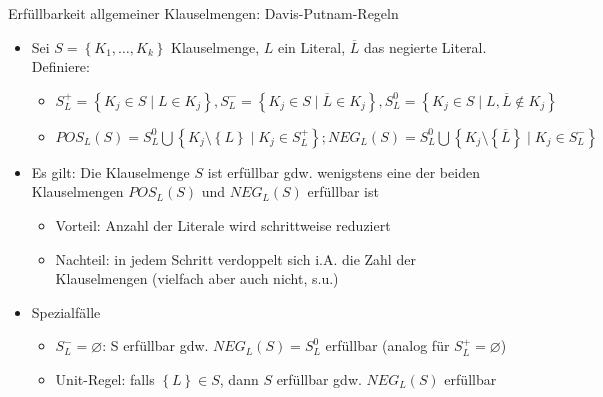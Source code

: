\begin{frame}{Erfüllbarkeit allgemeiner Klauselmengen: Davis-Putnam-Regeln}
	\begin{itemize}
		\item Sei $S=\left\{K_1, \ldots, K_k\right\}$ Klauselmenge, $L$ ein Literal, $\overline{L}$ das negierte Literal. Definiere:
		\begin{itemize}
			\item $S_L^+=\left\{K_j \in S \mid L \in K_j\right\}, S_L^-=\left\{K_j \in S \mid \overline{L} \in K_j\right\}, S_L^0=\left\{K_j \in S \mid L, \overline{L} \notin K_j\right\}$
			\item $POS_L(S)=S_L^0 \bigcup \left\{K_j \setminus \left\{L\right\} \mid K_j \in S_L^+\right\}; NEG_L(S)=S_L^0 \bigcup \left\{K_j \setminus \left\{\overline{L}\right\} \mid K_j \in S_L^-\right\}$
		\end{itemize}
		\item Es gilt: Die Klauselmenge $S$ ist erfüllbar gdw. wenigstens eine der beiden Klauselmengen $POS_L(S)$ und $NEG_L(S)$ erfüllbar ist
		\begin{itemize}
			\item Vorteil: Anzahl der Literale wird schrittweise reduziert
			\item Nachteil: in jedem Schritt verdoppelt sich i.A. die Zahl der Klauselmengen (vielfach aber auch nicht, s.u.)
		\end{itemize}
		\item Spezialfälle
		\begin{itemize}
			\item $S_L^-=\varnothing$: S erfüllbar gdw. $NEG_L(S)=S_L^0$ erfüllbar (analog für $S_L^+=\varnothing$)
			\item Unit-Regel: falls $\left\{L\right\} \in S$, dann $S$ erfüllbar gdw. $NEG_L(S)$ erfüllbar
		\end{itemize}
	\end{itemize}
\end{frame}

